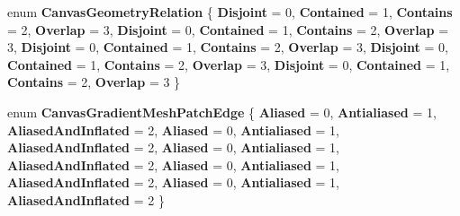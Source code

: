 \begin{DoxyCompactItemize}
enum {\bfseries Canvas\+Geometry\+Relation} \{ \newline
{\bfseries Disjoint} = 0, 
{\bfseries Contained} = 1, 
{\bfseries Contains} = 2, 
{\bfseries Overlap} = 3, 
\newline
{\bfseries Disjoint} = 0, 
{\bfseries Contained} = 1, 
{\bfseries Contains} = 2, 
{\bfseries Overlap} = 3, 
\newline
{\bfseries Disjoint} = 0, 
{\bfseries Contained} = 1, 
{\bfseries Contains} = 2, 
{\bfseries Overlap} = 3, 
\newline
{\bfseries Disjoint} = 0, 
{\bfseries Contained} = 1, 
{\bfseries Contains} = 2, 
{\bfseries Overlap} = 3, 
\newline
{\bfseries Disjoint} = 0, 
{\bfseries Contained} = 1, 
{\bfseries Contains} = 2, 
{\bfseries Overlap} = 3
 \}
\item 
\mbox{\label{namespace_microsoft_1_1_graphics_1_1_canvas_1_1_geometry_ad355c607a325a3422031f9e574b3dd1b}} 
enum {\bfseries Canvas\+Gradient\+Mesh\+Patch\+Edge} \{ \newline
{\bfseries Aliased} = 0, 
{\bfseries Antialiased} = 1, 
{\bfseries Aliased\+And\+Inflated} = 2, 
{\bfseries Aliased} = 0, 
\newline
{\bfseries Antialiased} = 1, 
{\bfseries Aliased\+And\+Inflated} = 2, 
{\bfseries Aliased} = 0, 
{\bfseries Antialiased} = 1, 
\newline
{\bfseries Aliased\+And\+Inflated} = 2, 
{\bfseries Aliased} = 0, 
{\bfseries Antialiased} = 1, 
{\bfseries Aliased\+And\+Inflated} = 2, 
\newline
{\bfseries Aliased} = 0, 
{\bfseries Antialiased} = 1, 
{\bfseries Aliased\+And\+Inflated} = 2
 \}
\end{DoxyCompactItemize}

